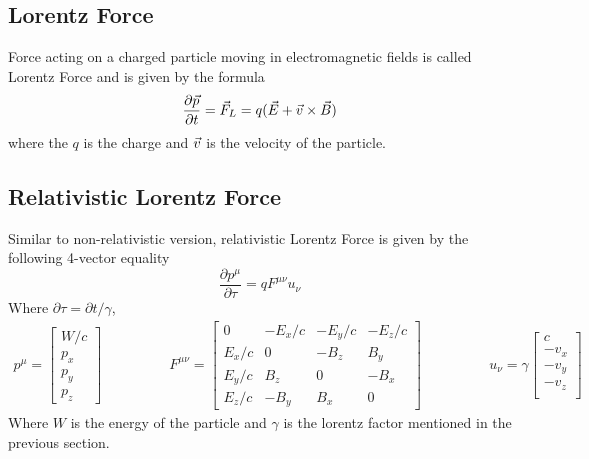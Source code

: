 \documentclass[a4paper,oneside,12pt]{report}
\numberwithin{equation}{chapter}
\begin{document}
\subsection{Lorentz Force} \label{sec:lorentz-force}
Force acting on a charged particle moving in electromagnetic fields is called Lorentz Force and is given by the formula
\begin{equation} \label{eq:lf}
    \frac{\partial \vec{p}}{\partial t} = \vec{F}_L=q(\vec{E}+ \vec{v} \times \vec{B})
\end{equation}
where the $q$ is the charge and $\vec{v}$ is the velocity of the particle. 

\subsection{Relativistic Lorentz Force}
Similar to non-relativistic version, relativistic Lorentz Force is given by the following 4-vector equality
\begin{equation}
    \frac{\partial p^{\mu}}{\partial \tau} = q F^{\mu \nu} u_{\nu}
\end{equation}
Where $ \partial \tau = \partial t / \gamma $,
\begin{equation}
    \begin{aligned}
        p^{\mu} = 
        \begin{bmatrix}
            W/c \\
            p_x         \\
            p_y \\
            p_z
        \end{bmatrix}    
    \end{aligned}
    \qquad\qquad
    \begin{aligned}
        F^{\mu\nu} = 
        \begin{bmatrix}
                0       & -E_x/c   & -E_y/c    & -E_z/c \\
                E_x/c   &   0      & -B_z      & B_y     \\
                E_y/c   &   B_z    &  0        & -B_x     \\
                E_z/c   &   -B_y   & B_x       & 0   
        \end{bmatrix} 
    \end{aligned}
    \qquad\qquad
    \begin{aligned}
        u_{\nu} = \gamma
        \begin{bmatrix}
                 c \\
                -v_x \\
                -v_y \\
                -v_z \\
        \end{bmatrix} 
    \end{aligned}
\end{equation}
Where $W$ is the energy of the particle and $\gamma$ is the lorentz factor mentioned in the previous section.
\end{document}
